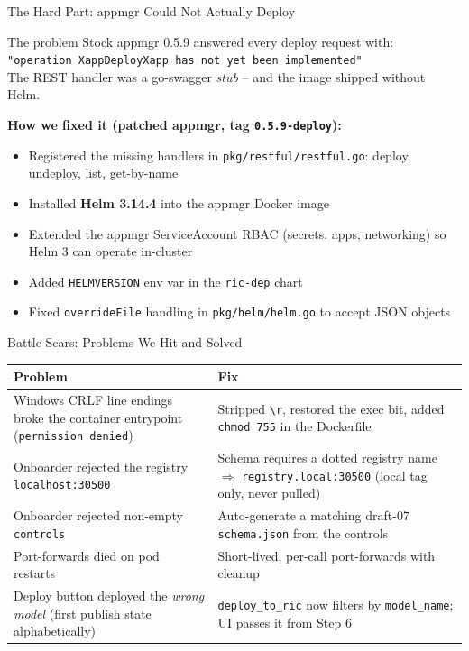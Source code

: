\documentclass[aspectratio=169]{beamer}
\begin{document}
\begin{frame}[fragile]{The Hard Part: appmgr Could Not Actually Deploy}
  \begin{alertblock}{The problem}
    Stock appmgr 0.5.9 answered every deploy request with: \\
    \texttt{"operation XappDeployXapp has not yet been implemented"} \\
    The REST handler was a go-swagger \emph{stub} -- and the image shipped without Helm.
  \end{alertblock}
  \textbf{How we fixed it (patched appmgr, tag \texttt{0.5.9-deploy}):}
  \begin{itemize}
    \item Registered the missing handlers in \texttt{pkg/restful/restful.go}:
      deploy, undeploy, list, get-by-name
    \item Installed \textbf{Helm 3.14.4} into the appmgr Docker image
    \item Extended the appmgr ServiceAccount RBAC (secrets, apps, networking)
      so Helm 3 can operate in-cluster
    \item Added \texttt{HELMVERSION} env var in the \texttt{ric-dep} chart
    \item Fixed \texttt{overrideFile} handling in \texttt{pkg/helm/helm.go}
      to accept JSON objects
  \end{itemize}
\end{frame}

\begin{frame}{Battle Scars: Problems We Hit and Solved}
  \small
  \begin{tabular}{p{} p{}}
    \textbf{Problem} & \textbf{Fix} \\ \hline
    Windows CRLF line endings broke the container entrypoint (\texttt{permission denied}) & Stripped \texttt{\textbackslash r}, restored the exec bit, added \texttt{chmod 755} in the Dockerfile \\[3pt]
    Onboarder rejected the registry \texttt{localhost:30500} & Schema requires a dotted registry name $\Rightarrow$ \texttt{registry.local:30500} (local tag only, never pulled) \\[3pt]
    Onboarder rejected non-empty \texttt{controls} & Auto-generate a matching draft-07 \texttt{schema.json} from the controls \\[3pt]
    Port-forwards died on pod restarts & Short-lived, per-call port-forwards with cleanup \\[3pt]
    Deploy button deployed the \emph{wrong model} (first publish state alphabetically) & \texttt{deploy\_to\_ric} now filters by \texttt{model\_name}; UI passes it from Step 6 \\
  \end{tabular}
\end{frame}
\end{document}
